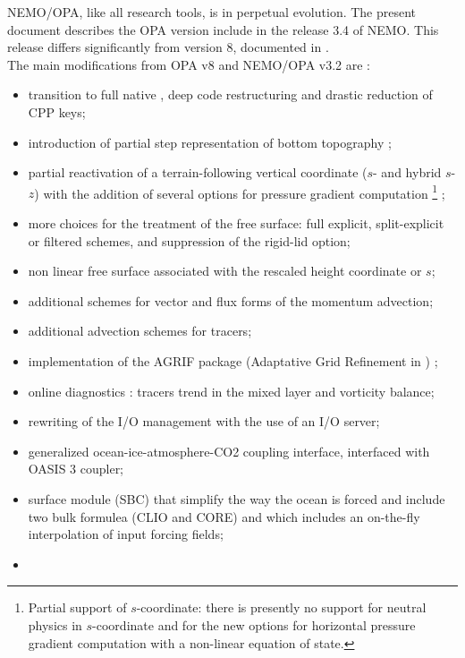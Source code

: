 \documentclass[../main/NEMO_manual]{subfiles}
\begin{document}
NEMO/OPA, like all research tools, is in perpetual evolution.
The present document describes the OPA version include in the release 3.4 of NEMO.
This release differs significantly from version 8, documented in \citet{madec.delecluse.ea_NPM98}. \\

The main modifications from OPA v8 and NEMO/OPA v3.2 are :

\begin{itemize}
\item
  transition to full native \fninety, deep code restructuring and drastic reduction of CPP keys; 
\item
  introduction of partial step representation of bottom topography
  \citep{barnier.madec.ea_OD06, le-sommer.penduff.ea_OM09, penduff.le-sommer.ea_OS07};
\item
  partial reactivation of a terrain-following vertical coordinate ($s$- and hybrid $s$-$z$) with
  the addition of several options for pressure gradient computation
  \footnote{
    Partial support of $s$-coordinate: there is presently no support for neutral physics in
    $s$-coordinate and for the new options for horizontal pressure gradient computation with
    a non-linear equation of state.
  }
  ;
\item
  more choices for the treatment of the free surface: full explicit, split-explicit or filtered schemes,
  and suppression of the rigid-lid option;
\item
  non linear free surface associated with the rescaled height coordinate \zstar or $s$;
\item
  additional schemes for vector and flux forms of the momentum advection;
\item
  additional advection schemes for tracers;
\item
  implementation of the AGRIF package (Adaptative Grid Refinement in \fortran) \citep{debreu.vouland.ea_CG08};
\item
  online diagnostics : tracers trend in the mixed layer and vorticity balance;
\item
  rewriting of the I/O management with the use of an I/O server;
\item
  generalized ocean-ice-atmosphere-CO2 coupling interface, interfaced with OASIS 3 coupler;
\item
  surface module (SBC) that simplify the way the ocean is forced and include two bulk formulea (CLIO and CORE) and
  which includes an on-the-fly interpolation of input forcing fields;
\item

\end{itemize}
\end{document}
